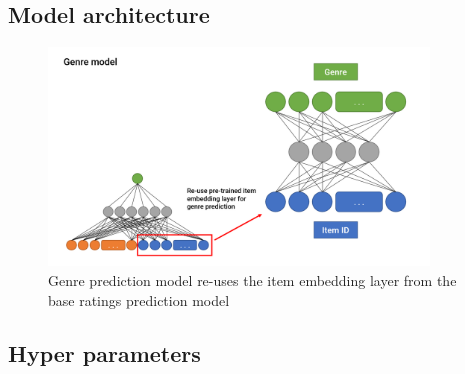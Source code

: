 \subsection{Model architecture}
\begin{figure}[H]
\centering
\includegraphics[width=0.9\textwidth]{Figures/3_genre-model.png}
\decoRule
\caption[Genre prediction model]{Genre prediction model re-uses the item embedding layer from the base ratings prediction model}
\label{fig:3_genre-prediction-architecture}
\end{figure}

\subsection{Hyper parameters}
